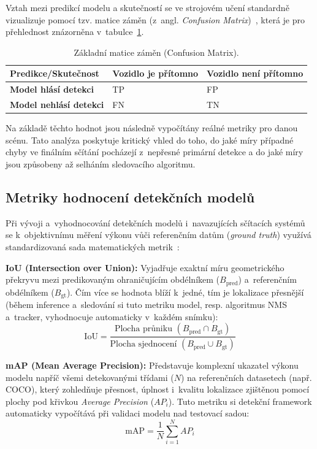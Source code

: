 Vztah mezi predikcí modelu a skutečností se ve strojovém učení standardně vizualizuje pomocí tzv. matice záměn (z~angl. \textit{Confusion Matrix})~\cite{szeliski_computer_vision}, která je pro přehlednost znázorněna v~tabulce~\ref{tab:confusion_matrix_theory}.

\begin{table}[H]
    \centering
    \begin{tabular}{|l|l|l|}
        \hline
        \textbf{Predikce/Skutečnost} & \textbf{Vozidlo je přítomno} & \textbf{Vozidlo není přítomno} \\ \hline
        \textbf{Model hlásí detekci} & TP & FP \\ \hline
        \textbf{Model nehlásí detekci} & FN & TN \\ \hline
    \end{tabular}
    \caption{Základní matice záměn (Confusion Matrix).}
    \label{tab:confusion_matrix_theory}
\end{table}

Na základě těchto hodnot jsou následně vypočítány reálné metriky pro danou scénu. Tato analýza poskytuje kritický vhled do toho, do jaké míry případné chyby ve finálním sčítání pocházejí z~nepřesné primární detekce a do jaké míry jsou způsobeny až selháním sledovacího algoritmu.

\subsection{Metriky hodnocení detekčních modelů}
Při vývoji a~vyhodnocování detekčních modelů i~navazujících sčítacích systémů se k~objektivnímu měření výkonu vůči referenčním datům (\textit{ground truth}) využívá standardizovaná sada matematických metrik~\cite{szeliski_computer_vision}:

\medskip
\noindent\textbf{IoU (Intersection over Union):} Vyjadřuje exaktní míru geometrického překryvu mezi predikovaným ohraničujícím obdélníkem ($B_{\text{pred}}$) a~referenčním obdélníkem ($B_{\text{gt}}$). Čím více se hodnota blíží k~jedné, tím je lokalizace přesnější (během inference a~sledování si tuto metriku model, resp. algoritmus NMS a~tracker, vyhodnocuje automaticky v~každém snímku):
$$\text{IoU} = \frac{\text{Plocha průniku } (B_{\text{pred}} \cap B_{\text{gt}})}{\text{Plocha sjednocení } (B_{\text{pred}} \cup B_{\text{gt}})}$$

\noindent\textbf{mAP (Mean Average Precision):} Představuje komplexní ukazatel výkonu modelu napříč všemi detekovanými třídami ($N$) na referenčních datasetech (např. COCO), který zohledňuje přesnost, úplnost i~kvalitu lokalizace zjištěnou pomocí plochy pod křivkou \textit{Average Precision} ($AP_i$). Tuto metriku si detekční framework automaticky vypočítává při validaci modelu nad testovací sadou:
$$\text{mAP} = \frac{1}{N} \sum_{i=1}^{N} AP_i$$

